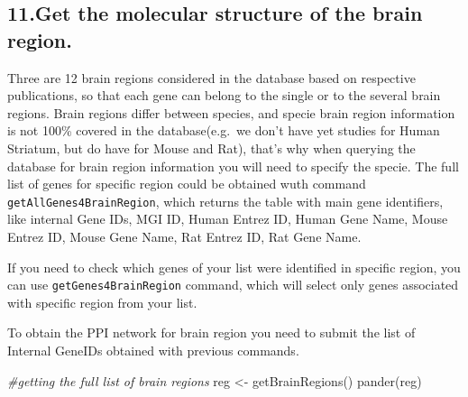 \documentclass[
]{article}
\newenvironment{Shaded}{\begin{snugshade}}{\end{snugshade}}
\newcommand{\CommentTok}[1]{\textcolor[rgb]{0.56,0.35,0.01}{\textit{#1}}}
\newcommand{\FunctionTok}[1]{\textcolor[rgb]{0.00,0.00,0.00}{#1}}
\newcommand{\NormalTok}[1]{#1}
\newcommand{\OtherTok}[1]{\textcolor[rgb]{0.56,0.35,0.01}{#1}}
\begin{document}
\hypertarget{get-the-molecular-structure-of-the-brain-region.}{%
\subsection{11.Get the molecular structure of the brain
region.}\label{get-the-molecular-structure-of-the-brain-region.}}

Three are 12 brain regions considered in the database based on
respective publications, so that each gene can belong to the single or
to the several brain regions. Brain regions differ between species, and
specie brain region information is not 100\% covered in the
database(e.g.~we don't have yet studies for Human Striatum, but do have
for Mouse and Rat), that's why when querying the database for brain
region information you will need to specify the specie. The full list of
genes for specific region could be obtained wuth command
\texttt{getAllGenes4BrainRegion}, which returns the table with main gene
identifiers, like internal Gene IDs, MGI ID, Human Entrez ID, Human Gene
Name, Mouse Entrez ID, Mouse Gene Name, Rat Entrez ID, Rat Gene Name.

If you need to check which genes of your list were identified in
specific region, you can use \texttt{getGenes4BrainRegion} command,
which will select only genes associated with specific region from your
list.

To obtain the PPI network for brain region you need to submit the list
of Internal GeneIDs obtained with previous commands.

\begin{Shaded}
\begin{Highlighting}[]
\CommentTok{\#getting the full list of brain regions}
\NormalTok{reg }\OtherTok{\textless{}{-}} \FunctionTok{getBrainRegions}\NormalTok{()}
\FunctionTok{pander}\NormalTok{(reg)}
\end{Highlighting}
\end{Shaded}
\end{document}
